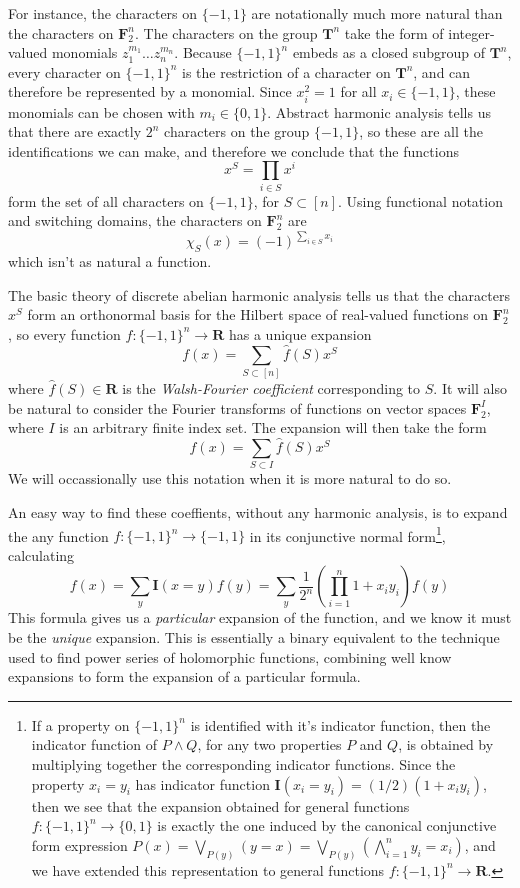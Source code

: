 For instance, the characters on $\{ -1, 1 \}$ are notationally much more natural than the characters on $\mathbf{F}_2^n$. The characters on the group $\mathbf{T}^n$ take the form of integer-valued monomials $z_1^{m_1} \dots z_n^{m_n}$. Because $\{ -1, 1 \}^n$ embeds as a closed subgroup of $\mathbf{T}^n$, every character on $\{ -1, 1 \}^n$ is the restriction of a character on $\mathbf{T}^n$, and can therefore be represented by a monomial. Since $x_i^2 = 1$ for all $x_i \in \{ -1, 1 \}$, these monomials can be chosen with $m_i \in \{ 0, 1 \}$. Abstract harmonic analysis tells us that there are exactly $2^n$ characters on the group $\{ -1, 1 \}$, so these are all the identifications we can make, and therefore we conclude that the functions
%
\[ x^S = \prod_{i \in S} x^i \]
%
form the set of all characters on $\{ -1, 1 \}$, for $S \subset [n]$. Using functional notation and switching domains, the characters on $\mathbf{F}_2^n$ are
%
\[ \chi_S(x) = (-1)^{\sum_{i \in S} x_i} \]
%
which isn't as natural a function.

The basic theory of discrete abelian harmonic analysis tells us that the characters $x^S$ form an orthonormal basis for the Hilbert space of real-valued functions on $\mathbf{F}_2^n$, so every function $f: \{ -1, 1 \}^n \to \mathbf{R}$ has a unique expansion
%
\[ f(x) = \sum_{S \subset [n]} \widehat{f}(S) x^S \]
%
where $\widehat{f}(S) \in \mathbf{R}$ is the {\it Walsh-Fourier coefficient} corresponding to $S$. It will also be natural to consider the Fourier transforms of functions on vector spaces $\mathbf{F}_2^I$, where $I$ is an arbitrary finite index set. The expansion will then take the form
%
\[ f(x) = \sum_{S \subset I} \widehat{f}(S) x^S \]
%
We will occassionally use this notation when it is more natural to do so.

An easy way to find these coeffients, without any harmonic analysis, is to expand the any function $f: \{ -1, 1 \}^n \to \{ -1, 1 \}$ in its conjunctive normal form\footnote{If a property on $\{ -1, 1 \}^n$ is identified with it's indicator function, then the indicator function of $P \wedge Q$, for any two properties $P$ and $Q$, is obtained by multiplying together the corresponding indicator functions. Since the property $x_i = y_i$ has indicator function $\mathbf{I}(x_i = y_i) = (1/2)(1 + x_iy_i)$, then we see that the expansion obtained for general functions $f: \{ -1, 1 \}^n \to \{ 0, 1 \}$ is exactly the one induced by the canonical conjunctive form expression $P(x) = \bigvee_{P(y)} (y = x) = \bigvee_{P(y)} \left( \bigwedge_{i = 1}^n y_i = x_i \right)$, and we have extended this representation to general functions $f: \{ -1, 1 \}^n \to \mathbf{R}$.}, calculating
%
\[ f(x) = \sum_y \mathbf{I}(x = y) f(y) = \sum_y \frac{1}{2^n} \left( \prod_{i = 1}^n 1 + x_iy_i \right) f(y) \]
%
This formula gives us a {\it particular} expansion of the function, and we know it must be the {\it unique} expansion. This is essentially a binary equivalent to the technique used to find power series of holomorphic functions, combining well know expansions to form the expansion of a particular formula.

